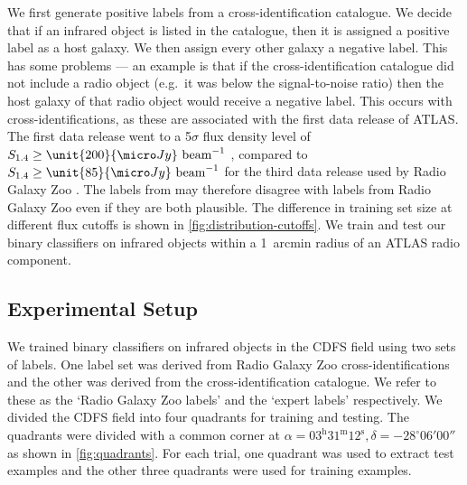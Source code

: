     We first generate positive labels from a cross-identification catalogue.
    We decide that if an infrared object is listed in the catalogue, then it
    is assigned a positive label as a host galaxy. We then assign every other galaxy a negative label. This has some problems
    --- an example is that if the cross-identification catalogue did not include a radio
    object (e.g.~it was below the signal-to-noise ratio) then the host galaxy
    of that radio object would receive a negative label. This occurs with
    \citet{norris06} cross-identifications, as these are associated with the
    first data release of ATLAS. The first data release went to a 5$\sigma$
    flux density level of $S_{1.4} \geq \unit{200}{\micro\jansky}\text{
    beam}^{-1}$ \citep{norris06}, compared to $S_{1.4} \geq \unit{85}{\micro\jansky}\text{
    beam}^{-1}$ for the third data release used by Radio Galaxy Zoo
    \citep{franzen15}. The labels from \citet{norris06} may therefore disagree with labels
    from Radio Galaxy Zoo even if they are both plausible. The difference in
    training set size at different flux cutoffs is shown in
    \autoref{fig:distribution-cutoffs}. We train and test our binary
    classifiers on infrared objects within a 1~arcmin radius of an ATLAS radio
    component.

  \subsection{Experimental Setup}
  \label{sec:atlas-xid-experimental-setup}

    We trained binary classifiers on infrared objects in the CDFS field using
    two sets of labels. One label set was derived from Radio Galaxy Zoo
    cross-identifications and the other was derived from the \citet{norris06}
    cross-identification catalogue. We refer to these as the `Radio Galaxy Zoo
    labels' and the `expert labels' respectively. We divided the CDFS field
    into four quadrants for training and testing. The quadrants were divided
    with a common corner at $\alpha = 03^\text{h}31^\text{m}12^\text{s},
    \delta = -28^\circ{}06'00''$ as shown in \autoref{fig:quadrants}. For
    each trial, one quadrant was used to extract test examples and the other
    three quadrants were used for training examples.

